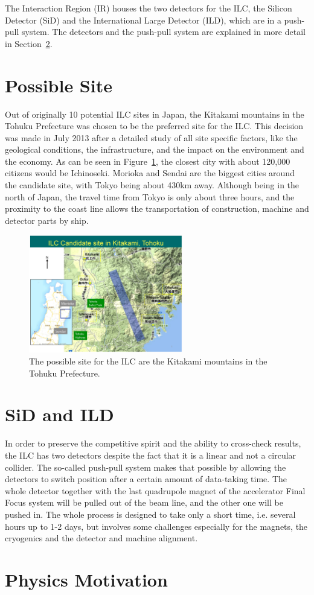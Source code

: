 The Interaction Region (IR) houses the two detectors for the ILC, the Silicon Detector (SiD) and the International Large Detector (ILD), which are in a push-pull system.
The detectors and the push-pull system are explained in more detail in Section~\ref{ILC:detectors}.

\section{Possible Site}
\label{ILC:site}
Out of originally 10 potential ILC sites in Japan, the Kitakami mountains in the Tohuku Prefecture was chosen to be the preferred site for the ILC.
This decision was made in July 2013 after a detailed study of all site specific factors, like the geological conditions, the infrastructure, and the impact on the environment and the economy.
As can be seen in Figure~\ref{fig:ILC_Site}, the closest city with about 120,000 citizens would be Ichinoseki.
Morioka and Sendai are the biggest cities around the candidate site, with Tokyo being about \unit{430}{km} away.
Although being in the north of Japan, the travel time from Tokyo is only about three hours, and the proximity to the coast line allows the transportation of construction, machine and detector parts by ship.

\begin{figure}
\centering
\includegraphics[width=0.6\textwidth]{Figures/ILC-site.jpg}
\caption[Possible site for the ILC]{The possible site for the ILC are the Kitakami mountains in the Tohuku Prefecture.\cite{Site}}
\label{fig:ILC_Site}
\end{figure}

\section{SiD and ILD}
\label{ILC:detectors}

In order to preserve the competitive spirit and the ability to cross-check results, the ILC has two detectors despite the fact that it is a linear and not a circular collider.
The so-called push-pull system makes that possible by allowing the detectors to switch position after a certain amount of data-taking time.
The whole detector together with the last quadrupole magnet of the accelerator Final Focus system will be pulled out of the beam line, and the other one will be pushed in.
The whole process is designed to take only a short time, i.e. several hours up to 1-2 days, but involves some challenges especially for the magnets, the cryogenics and the detector and machine alignment.\cite[p. 28-29]{TDR1}


\section{Physics Motivation}
\label{ILC:physicsmotivation}
